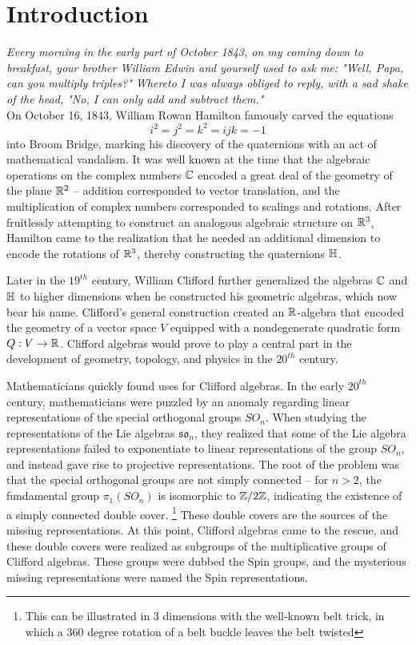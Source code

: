 %
\chapter*{Introduction}
%
\subsectionend $ $\\
\emph{Every morning in the early part of October 1843, on my coming down to
breakfast, your brother William Edwin and yourself used to ask me: "Well,
Papa, can you multiply triples?" Whereto I was always obliged to reply, with a
sad shake of the head, "No, I can only add and subtract them."}\\
%
%
\subsectionend $ $\\
%

On October 16, 1843, William Rowan Hamilton famously carved the equations
\[
i^2 = j^2 = k^2 = ijk = -1
\]
into Broom Bridge, marking his discovery of the quaternions with an act of
mathematical vandalism. It was well known at the time that the algebraic operations
on the complex numbers $\mathbb{C}$ encoded a great deal of the geometry of the plane
$\mathbb{R}^2$ -- addition corresponded to vector translation, and the multiplication of
complex numbers corresponded to scalings and rotations. After fruitlessly attempting
to construct an analogous algebraic structure on $\mathbb{R}^3$, Hamilton came to the
realization that he needed an additional dimension to encode the rotations
of $\mathbb{R}^3$, thereby constructing the quaternions $\mathbb{H}$.

Later in the $19^{th}$ century, William Clifford further generalized the algebras
$\mathbb{C}$ and $\mathbb{H}$ to higher dimensions when he constructed his geometric algebras,
which now bear his name. Clifford's general construction created an $\mathbb{R}$-algebra
that encoded the geometry of a vector space $V$ equipped with a nondegenerate
quadratic form $Q : V \to \mathbb{R}$. Clifford algebras would prove to play a central
part in the development of geometry, topology, and physics in the $20^{th}$
century.

Mathematicians quickly found uses for Clifford algebras. In the early $20^{th}$ century,
mathematicians were puzzled by an anomaly
regarding linear representations of the special orthogonal groups $SO_n$.
When studying the representations of the Lie algebras $\mathfrak{so}_n$,
they realized that some of the Lie algebra representations failed to
exponentiate to linear representations of the group $SO_n$, and instead
gave rise to projective representations. The root of the problem was
that the special orthogonal groups are not simply connected --
for $n > 2$, the fundamental group $\pi_1(SO_n)$ is isomorphic to
$\mathbb{Z}/2\mathbb{Z}$, indicating the existence of a simply connected double cover.
\footnote{This can be
illustrated in 3 dimensions with the well-known belt trick, in which a 360
degree rotation of a belt buckle leaves the belt twisted}
These double covers are the sources of the missing representations.
At this point, Clifford algebras came to the rescue, and these double
covers were realized as subgroups of the multiplicative groups of Clifford
algebras. These groups were dubbed the Spin groups, and the mysterious missing
representations were named the Spin representations.

